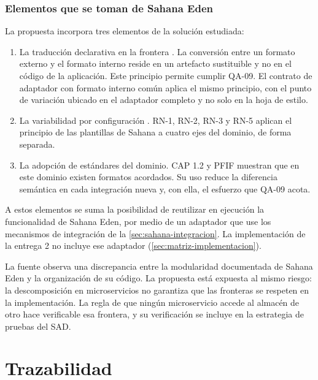 \documentclass[11pt,letterpaper]{article}
\begin{document}
\subsubsection{Elementos que se toman de Sahana Eden}
\label{sec:se-toma}

La propuesta incorpora tres elementos de la solución estudiada:

\begin{enumerate}
  \item La traducción declarativa en la frontera \cite{eden-xslt}. La conversión entre un formato
        externo y el formato interno reside en un artefacto sustituible y no en el código de la
        aplicación. Este principio permite cumplir QA-09. El contrato de adaptador con formato
        interno común aplica el mismo principio, con el punto de variación ubicado en el adaptador
        completo y no solo en la hoja de estilo.
  \item La variabilidad por configuración \cite{eden-wiki}. RN-1, RN-2, RN-3 y RN-5 aplican el
        principio de las plantillas de Sahana a cuatro ejes del dominio, de forma separada.
  \item La adopción de estándares del dominio. CAP 1.2 \cite{sambro} y PFIF \cite{eden-xslt}
        muestran que en este dominio existen formatos acordados. Su uso reduce la diferencia
        semántica en cada integración nueva y, con ella, el esfuerzo que QA-09 acota.
\end{enumerate}

A estos elementos se suma la posibilidad de reutilizar en ejecución la funcionalidad de Sahana Eden,
por medio de un adaptador que use los mecanismos de integración de la
\cref{sec:sahana-integracion}. La implementación de la entrega 2 no incluye ese adaptador
(\cref{sec:matriz-implementacion}).

La fuente \cite{desosa2018} observa una discrepancia entre la modularidad documentada de Sahana Eden
y la organización de su código. La propuesta está expuesta al mismo riesgo: la descomposición en
microservicios no garantiza que las fronteras se respeten en la implementación. La regla de que
ningún microservicio accede al almacén de otro hace verificable esa frontera, y su verificación se
incluye en la estrategia de pruebas del SAD.

\newpage
\section{Trazabilidad}
\label{sec:trazabilidad}
\end{document}
